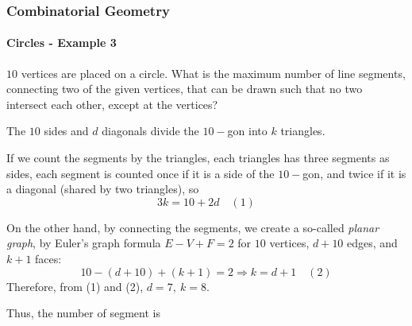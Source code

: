 \documentclass[8pt,xcolor=table,dvipsnames]{beamer}
\begin{document}
\begin{frame}[t]
    \frametitle{Combinatorial Geometry}
    \framesubtitle{Circles - Example 3}
    \begin{example}[MIC-2021-SM2-R1-P7]
        $10$ vertices are placed on a circle.
        What is the maximum number of line segments, connecting two of the given vertices,
        that can be drawn such that no two intersect each other, except at the vertices?
    \end{example}
    The $10$ sides and $d$ diagonals divide the $10-$gon into $k$ triangles.
    
    If we count the segments by the triangles, each triangles has three segments as sides,
    each segment is counted once if it is a side of the $10-$gon,
    and twice if it is a diagonal (shared by two triangles), so
    \[
        3k = 10 + 2d \quad(1)
    \]
    
    On the other hand, by connecting the segments, we create a so-called \textit{planar graph},
    by Euler's graph formula $E-V+F=2$ for $10$ vertices, $d+10$ edges, and $k+1$ faces:
    \[
        10 - (d+10) + (k+1) = 2 \Rightarrow k = d+1 \quad(2)
    \]
    Therefore, from (1) and (2), $d=7,\ k=8.$
    
    Thus, the number of segment is 
\end{frame}
\end{document}
